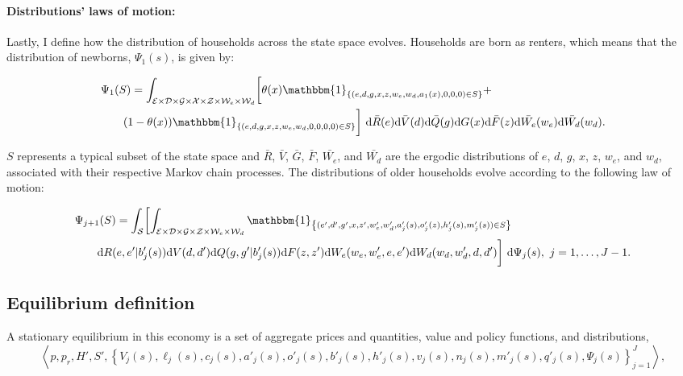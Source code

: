 \documentclass[parskip=full]{article}
\newcommand{\indicator}[1]{\mathbbm{1}_{\left\{ {#1} \right\} }}
\begin{document}
\paragraph{Distributions' laws of motion:} Lastly, I define how the distribution of households across the state space evolves. Households are born as renters, which means that the distribution of newborns, $\Psi_1(s)$, is given by:

\begin{align}\label{eq:lom1}
    & \Psi_1(S) = \int_{\mathcal{E}\times \mathcal{D}\times \mathcal{G} \times \mathcal{X}\times \mathcal{Z}\times \mathcal{W}_{e}\times \mathcal{W}_{d}}\biggl[\theta(x)\indicator{(e,d,g,x,z,w_{e},w_{d},a_1(x),0,0,0)\in S} + \\
    & \qquad (1-\theta(x))\indicator{(e,d,g,x,z,w_{e},w_{d},0,0,0,0)\in S}\biggl]\ \mathrm{d}\bar{R}(e)\mathrm{d}\bar{V}(d)\mathrm{d}\bar{Q}(g)\mathrm{d}G(x) \mathrm{d}\bar{F}(z)\mathrm{d}\bar{W_{e}}(w_{e})\mathrm{d}\bar{W_{d}}(w_{d}). \notag
\end{align}

\noindent $S$ represents a typical subset of the state space and $\bar{R}$, $\bar{V}$, $\bar{G}$, $\bar{F}$, $\bar{W_{e}}$, and $\bar{W_{d}}$ are the ergodic distributions of $e$, $d$, $g$, $x$, $z$, $w_{e}$, and $w_{d}$, associated with their respective Markov chain processes. The distributions of older households evolve according to the following law of motion:

\begin{align}\label{eq:lom2}
    & \Psi_{j+1}(S) = \int_{\mathcal{S}} \biggl[\int_{\mathcal{E}\times \mathcal{D}\times \mathcal{G}\times \mathcal{Z} \times \mathcal{W}_{e}\times \mathcal{W}_{d}}\indicator{ (e',d',g',x,z',w_{e}',w_{d}',a'_j(s),o'_j(z),h'_j(s),m'_j(s))\in S }\ \\ & \qquad \mathrm{d}R(e,e'|b'_{j}(s))\mathrm{d}V(d,d')\mathrm{d}Q(g,g'|b'_{j}(s))\mathrm{d}F(z,z')\mathrm{d}W_{e}(w_{e},w_{e}',e,e')\mathrm{d}W_{d}(w_{d},w_{d}',d,d')\biggl]\ \mathrm{d}\Psi_j(s),\ j=1,\ldots,J-1. \notag
\end{align}

\subsection{Equilibrium definition}\label{subsection: equilibrium_defintion}

A stationary equilibrium in this economy is a set of aggregate prices and quantities, value and policy functions, and distributions,
\begin{equation}
    \left\langle p,p_{r},H',S',\left\{V_{j}(s),\ell_{j}(s),c_{j}(s),a'_{j}(s),o'_{j}(s),b'_{j}(s),h'_{j}(s),v_{j}(s),n_j(s),m'_{j}(s),q'_j(s),\Psi_j(s)\right\}_{j=1}^J\right\rangle,
\end{equation}
\end{document}
